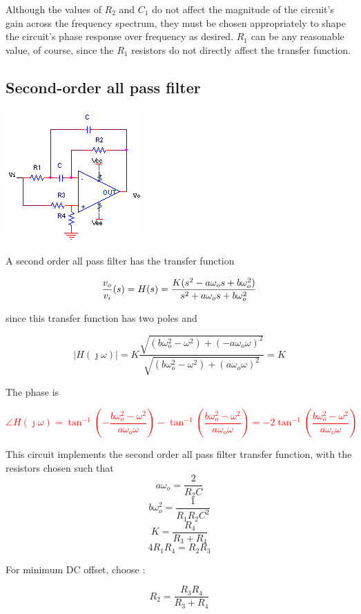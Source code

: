 Although the values of $R_2$ and $C_1$ do not affect the magnitude of the circuit's gain across the frequency spectrum, they must be chosen appropriately to shape the circuit's phase response over frequency as desired.
$R_1$ can be any reasonable value, of course, since the $R_1$ resistors do not directly affect the transfer function.

\subsection{Second-order all pass filter}
\begin{center}
	\includegraphics{schematics/2ndorder_allpass.PNG}
\end{center}
A second order all pass filter has the transfer function

\textcolor{red}{
\begin{equation}
\frac{\vout}{\vin}(s) = H(s) = \frac{K(s^2 - a\omega_{o}s + b\omega_{o}^2)}{s^2 + a\omega_{o}s + b\omega_{o}^2}
\label{eq:2ndorder_allpass}
\end{equation}
}

since this transfer function has two poles and

\begin{equation}
|H(\jmath\omega)| = K\frac{\sqrt{(b\omega_{o}^2-\omega^2) + (-a\omega_{o}\omega)^2}}{\sqrt{(b\omega_{o}^2-\omega^2) + (a\omega_{o}\omega)^2}} = K
\end{equation}

The phase is

\textcolor{red}{
\begin{equation}
\angle H(\jmath\omega) = \tan^{-1}\left(-\frac{b\omega_{o}^2-\omega^2}{a\omega_{o}\omega}\right) - \tan^{-1}\left(\frac{b\omega_{o}^2-\omega^2}{a\omega_{o}\omega}\right) = -2\tan^{-1}\left(\frac{b\omega_{o}^2-\omega^2}{a\omega_{o}\omega}\right)
\label{eq:2ndorder_allpass_angle}
\end{equation}
}

This circuit implements the second order all pass filter transfer function, with the resistors chosen such that
\begin{equation}
a\omega_{o} = \frac{2}{R_2 C}
\end{equation}
\begin{equation}
b\omega_{o}^2 = \frac{1}{R_1 R_2 C^2}
\end{equation}
\begin{equation}
K = \frac{R_4}{R_3 + R_4}
\end{equation}
\begin{equation}
4R_1 R_4 = R_2 R_3
\end{equation}

For minimum DC offset, choose \autocite[151-153]{op-amp-circuits-johnson}:

\begin{equation}
R_2 = \frac{R_3 R_4}{R_3 + R_4}
\end{equation}